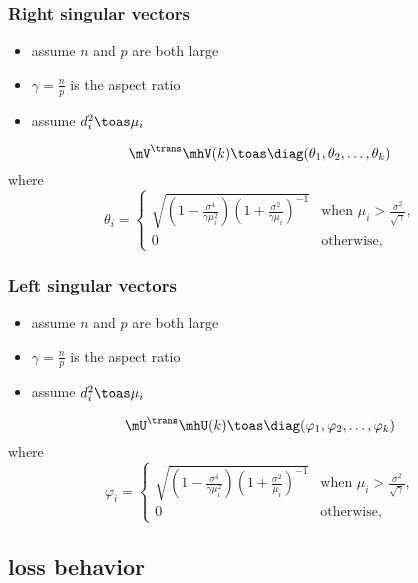 \documentclass{beamer}
\begin{document}
\begin{frame}
  \frametitle{Right singular vectors}
  \begin{itemize}
  \item assume $n$ and $p$ are both large
  \item $\gamma = \frac{n}{p}$ is the aspect ratio
  \item assume $d_i^2 \toas \mu_i$
  \end{itemize}
  \begin{theorem}
    \[
      \mV^\trans \mhV(k)
      \toas
      \diag(\theta_1, \theta_2, \ldots, \theta_k)
    \]
    where
    \[
       \theta_i =  \begin{cases}
            \sqrt{ 
                \left( 1 - \frac{\sigma^4}{ \gamma \mu_i^2} \right) 
                \left( 1 + \frac{\sigma^2}{ \gamma \mu_i  } \right)^{-1} }
            &\text{when $\mu_i > \frac{\sigma^2}{\sqrt{\gamma}}$,} \\
            0
            &\text{otherwise,}
        \end{cases} 
    \]
  \end{theorem}
\end{frame}

\begin{frame} 
  \frametitle{Left singular vectors}
  \begin{itemize}
  \item assume $n$ and $p$ are both large
  \item $\gamma = \frac{n}{p}$ is the aspect ratio
  \item assume $d_i^2 \toas \mu_i$
  \end{itemize}
  \begin{theorem}
    \[
      \mU^\trans \mhU(k)
      \toas
      \diag(\varphi_1, \varphi_2, \ldots, \varphi_k)
    \]
    where
    \[
      \varphi_i =
        \begin{cases}
            \sqrt{
                \left( 1 - \frac{\sigma^4}{ \gamma \mu_i^2} \right)
                \left( 1 + \frac{\sigma^2}{ \mu_i  } \right)^{-1} }
            &\text{when $\mu_i > \frac{\sigma^2}{\sqrt{\gamma}}$,} \\
            0
            &\text{otherwise,}
        \end{cases}
    \]
  \end{theorem}
\end{frame}

\subsection{loss behavior}
\end{document}
